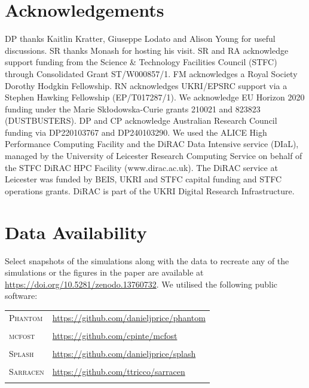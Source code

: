 \documentclass[usenatbib]{mnras}
\newcommand{\djp}[1]{\textcolor{cyan}{DJP: #1}}
\begin{document}
\section*{Acknowledgements}
DP thanks Kaitlin Kratter, Giuseppe Lodato and Alison Young for useful discussions. SR thanks Monash for hosting his visit. SR and RA acknowledge support funding from the Science \& Technology Facilities Council (STFC) through Consolidated Grant ST/W000857/1. FM acknowledges a Royal Society Dorothy Hodgkin Fellowship. RN acknowledges UKRI/EPSRC support via a Stephen Hawking Fellowship (EP/T017287/1). We acknowledge EU Horizon 2020 funding under the Marie Sk\l{}odowska-Curie grants 210021 and 823823 (DUSTBUSTERS). DP and CP acknowledge Australian Research Council funding via DP220103767 and DP240103290. We used the ALICE High Performance Computing Facility and the DiRAC Data Intensive service (DIaL), managed by the University of Leicester Research Computing Service on behalf of the STFC DiRAC HPC Facility (www.dirac.ac.uk). The DiRAC service at Leicester was funded by BEIS, UKRI and STFC capital funding and STFC operations grants. DiRAC is part of the UKRI Digital Research Infrastructure.

\section*{Data Availability}
Select snapshots of the simulations along with the data to recreate any of the simulations or the figures in the paper are available at \url{https://doi.org/10.5281/zenodo.13760732}. We utilised the following public software:\\

\begin{tabular}{ll}
\hspace{-0.6cm}\textsc{Phantom}
&\url{https://github.com/danieljprice/phantom}\\
& \citep{2018Price} \\
\hspace{-0.6cm}\textsc{mcfost} &\url{https://github.com/cpinte/mcfost}\\
& \citep{2006Pinte,2009Pinte} \\
\hspace{-0.6cm}\textsc{Splash}
&\url{https://github.com/danieljprice/splash}\\ & \citep{2007Price} \\
\hspace{-0.6cm}\textsc{Sarracen} &\url{https://github.com/ttricco/sarracen}\\
& \citep{sarracen}
\end{tabular}
\end{document}
